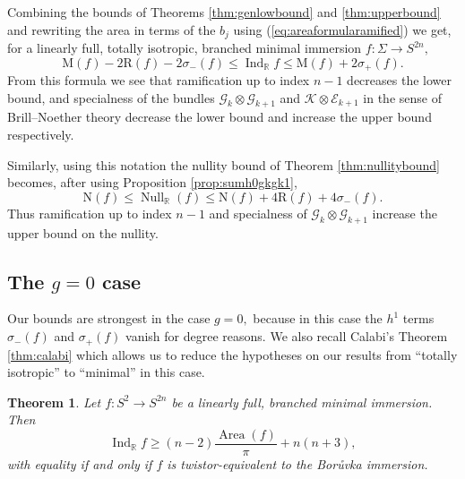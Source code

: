 \documentclass[11pt]{article}
\newtheorem{theorem}{Theorem}[section]
\theoremstyle{definition}
\newcommand{\R}{\mathbb{R}}
\numberwithin{equation}{section}
\begin{document}
Combining the bounds of Theorems \ref{thm:genlowbound} and \ref{thm:upperbound} and rewriting the area in terms of the $b_j$ using (\ref{eq:areaformularamified}) we get, for a linearly full, totally isotropic, branched minimal immersion $f: \Sigma \to S^{2n},$
\begin{equation}\label{eq:twosidedbound}
    \mathrm{M}(f) - 2 \mathrm{R}(f) - 2 \sigma_-(f) \leq \operatorname{Ind}_\R f \leq \mathrm{M}(f) + 2 \sigma_+(f).
\end{equation}
From this formula we see that ramification up to index $n-1$ decreases the lower bound, and specialness of the bundles $\mathcal{G}_k \otimes \mathcal{G}_{k+1}$ and $\mathcal{K} \otimes \mathcal{E}_{k+1}$ in the sense of Brill--Noether theory decrease the lower bound and increase the upper bound respectively.

Similarly, using this notation the nullity bound of Theorem \ref{thm:nullitybound} becomes, after using Proposition \ref{prop:sumh0gkgk1},
\begin{equation}\label{eq:twosidednullity}
    \mathrm{N}(f) \leq \operatorname{Null}_\R(f) \leq \mathrm{N}(f) + 4 \mathrm{R}(f) + 4 \sigma_-(f).
\end{equation}
Thus ramification up to index $n-1$ and specialness of $\mathcal{G}_k \otimes \mathcal{G}_{k+1}$ increase the upper bound on the nullity.

\subsection{The $g=0$ case}

\indent \indent Our bounds are strongest in the case $g=0,$ because in this case the $h^1$ terms $\sigma_-(f)$ and $\sigma_+(f)$ vanish for degree reasons. We also recall Calabi's Theorem \ref{thm:calabi} which allows us to reduce the hypotheses on our results from ``totally isotropic'' to ``minimal'' in this case.

\begin{theorem}\label{thm:S2lowerbound}
	Let $f: S^2 \to S^{2n}$ be a linearly full, branched minimal immersion. Then
	\begin{equation}\label{eq:S2lower}
		\operatorname{Ind}_\R f \geq (n-2) \frac{\operatorname{Area}(f)}{\pi} + n(n+3),
	\end{equation}
	with equality if and only if $f$ is twistor-equivalent to the Bor\r{u}vka immersion.
\end{theorem}
\end{document}
